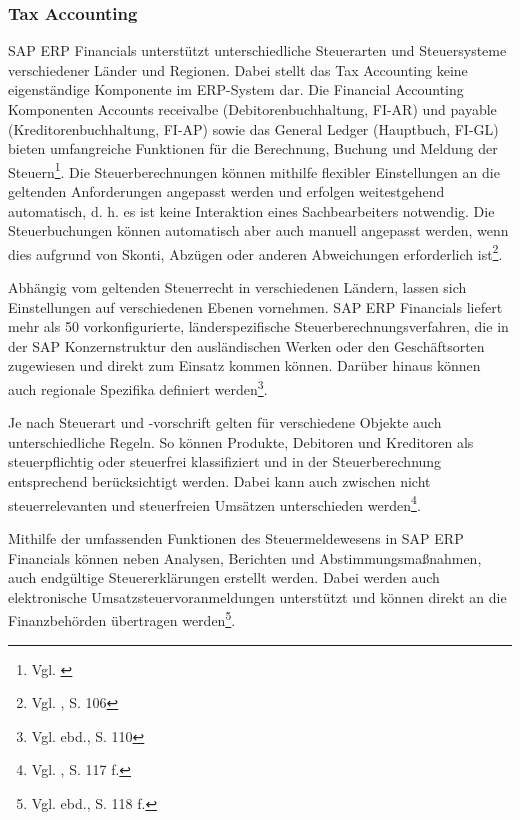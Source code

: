 \subsubsection{Tax Accounting} %
SAP ERP Financials unterstützt unterschiedliche Steuerarten und Steuersysteme verschiedener Länder und Regionen. Dabei stellt das Tax Accounting keine eigenständige Komponente im ERP-System dar. Die Financial Accounting Komponenten Accounts receivalbe (Debitorenbuchhaltung, FI-AR) und payable (Kreditorenbuchhaltung, FI-AP) sowie das General Ledger (Hauptbuch, FI-GL) bieten umfangreiche Funktionen für die Berechnung, Buchung und Meldung der Steuern\footnote{Vgl. \cite{SAPFIAPAR2006}}. Die Steuerberechnungen können mithilfe flexibler Einstellungen an die geltenden Anforderungen angepasst werden und erfolgen weitestgehend automatisch, d. h. es ist keine Interaktion eines Sachbearbeiters notwendig. Die Steuerbuchungen können automatisch aber auch manuell angepasst werden, wenn dies aufgrund von Skonti, Abzügen oder anderen Abweichungen erforderlich ist\footnote{Vgl. \cite{Patel2009}, S. 106}.

Abhängig vom geltenden Steuerrecht in verschiedenen Ländern, lassen sich Einstellungen auf verschiedenen Ebenen vornehmen. SAP ERP Financials liefert mehr als 50 vorkonfigurierte, länderspezifische Steuerberechnungsverfahren, die in der SAP Konzernstruktur den ausländischen Werken oder den Geschäftsorten zugewiesen und direkt zum Einsatz kommen können. Darüber hinaus können auch regionale Spezifika definiert werden\footnote{Vgl. ebd., S. 110}.

Je nach Steuerart und -vorschrift gelten für verschiedene Objekte auch unterschiedliche Regeln. So können Produkte, Debitoren und Kreditoren als steuerpflichtig oder steuerfrei klassifiziert und in der Steuerberechnung entsprechend berücksichtigt werden. Dabei kann auch zwischen nicht steuerrelevanten und steuerfreien Umsätzen unterschieden werden\footnote{Vgl. \cite{Patel2009}, S. 117 f.}.

Mithilfe der umfassenden Funktionen des Steuermeldewesens in SAP ERP Financials können neben Analysen, Berichten und Abstimmungsmaßnahmen, auch endgültige Steuererklärungen erstellt werden. Dabei werden auch elektronische Umsatzsteuervoranmeldungen unterstützt und können direkt an die Finanzbehörden übertragen werden\footnote{Vgl. ebd., S. 118 f.}.


